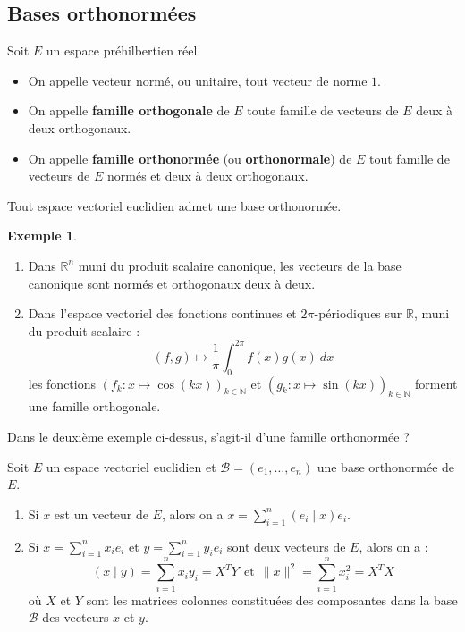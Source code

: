 \documentclass[french]{article}
\newcommand{\N}{\mathbb{N}}
\newcommand{\R}{\mathbb{R}}
\theoremstyle{plain}
\theoremstyle{definition}
\newtheorem*{ex}{Exemple}
\theoremstyle{remark}
\begin{document}
\subsection{Bases orthonormées}

Soit $E$ un espace préhilbertien réel.

\begin{dfn}
	\begin{itemize}
		\item On appelle vecteur normé, ou unitaire, tout vecteur de norme $1$.
		\item On appelle \textbf{famille orthogonale} de $E$ toute famille de vecteurs de $E$ deux à deux orthogonaux.
		\item On appelle \textbf{famille orthonormée} (ou \textbf{orthonormale}) de $E$ tout famille de vecteurs de $E$ normés et deux à deux orthogonaux.
	\end{itemize}
\end{dfn}

\begin{prop}
	Tout espace vectoriel euclidien admet une base orthonormée.
\end{prop}

\begin{ex}
	\begin{enumerate}
		\item Dans $\R^n$ muni du produit scalaire canonique, les vecteurs de la base canonique sont normés et orthogonaux deux à deux.
		\item Dans l'espace vectoriel des fonctions continues et $2\pi$-périodiques sur $\R$, muni du produit scalaire : $$(f,g)\mapsto\frac{1}{\pi}\int_{0}^{2\pi}f(x)g(x)\ dx$$ les fonctions $(f_k:x\mapsto\cos(kx))_{k\in\N}$ et $(g_k:x\mapsto\sin(kx))_{k\in\N}$ forment une famille orthogonale.
	\end{enumerate}
\end{ex}

\begin{exo}
	Dans le deuxième exemple ci-dessus, s'agit-il d'une famille orthonormée ?
\end{exo}

\begin{prop}
	Soit $E$ un espace vectoriel euclidien et $\mathcal{B}=(e_1,\ldots,e_n)$ une base orthonormée de $E$.
	\begin{enumerate}
		\item Si $x$ est un vecteur de $E$, alors on a $x=\displaystyle\sum_{i=1}^{n}(e_i\mid x)e_i$.
		\item Si $x=\displaystyle\sum_{i=1}^{n}x_ie_i$ et $y=\displaystyle\sum_{i=1}^{n}y_ie_i$ sont deux vecteurs de $E$, alors on a : $$(x\mid y)=\sum_{i=1}^{n}x_iy_i=X^TY\ \ \text{et}\ \ \lVert x\rVert^2=\sum_{i=1}^{n}x_i^2=X^TX$$ où $X$ et $Y$ sont les matrices colonnes constituées des composantes dans la base $\mathcal{B}$ des vecteurs $x$ et $y$.
	\end{enumerate}
\end{prop}
\end{document}
